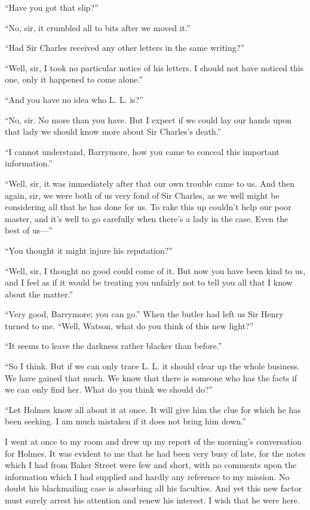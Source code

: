 \documentclass[paper=5.5in:8.5in,BCOR=7mm,twoside,DIV=calc,12pt,usegeometry,openany,chapterprefix,endperiod]{scrbook} %
\begin{document}
\enquote{Have you got that slip?}

\enquote{No, sir, it crumbled all to bits after we moved it.}

\enquote{Had Sir Charles received any other letters in the same writing?}

\enquote{Well, sir, I took no particular notice of his letters. I should not have noticed this one, only it happened to come alone.}

\enquote{And you have no idea who L. L. is?}

\enquote{No, sir. No more than you have. But I expect if we could lay our hands upon that lady we should know more about Sir Charles's death.}

\enquote{I cannot understand, Barrymore, how you came to conceal this important information.}

\enquote{Well, sir, it was immediately after that our own trouble came to us. And then again, sir, we were both of us very fond of Sir Charles, as we well might be considering all that he has done for us. To rake this up couldn't help our poor master, and it's well to go carefully when there's a lady in the case. Even the best of us\nobreakdash---}

\enquote{You thought it might injure his reputation?}

\enquote{Well, sir, I thought no good could come of it. But now you have been kind to us, and I feel as if it would be treating you unfairly not to tell you all that I know about the matter.}

\enquote{Very good, Barrymore; you can go.} When the butler had left us Sir Henry turned to me. \enquote{Well, Watson, what do you think of this new light?}

\enquote{It seems to leave the darkness rather blacker than before.}

\enquote{So I think. But if we can only trace L. L. it should clear up the whole business. We have gained that much. We know that there is someone who has the facts if we can only find her. What do you think we should do?}

\enquote{Let Holmes know all about it at once. It will give him the clue for which he has been seeking. I am much mistaken if it does not bring him down.}

I went at once to my room and drew up my report of the morning's conversation for Holmes. It was evident to me that he had been very busy of late, for the notes which I had from Baker Street were few and short, with no comments upon the information which I had supplied and hardly any reference to my mission. No doubt his blackmailing case is absorbing all his faculties. And yet this new factor must surely arrest his attention and renew his interest. I wish that he were here.
\end{document}
